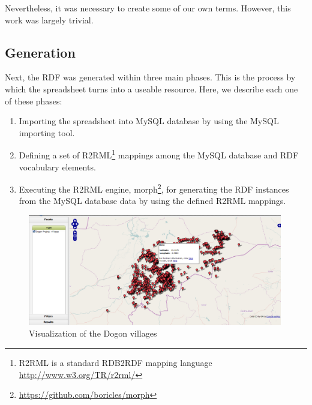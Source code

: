 Nevertheless, it was necessary to create some of our own terms. However, this work was largely trivial. %

\subsection{Generation}
Next, the RDF was generated within three main phases. This is the process by which the spreadsheet turns into a useable resource. Here, we describe each one of these phases:

\begin{enumerate}
	\item Importing the spreadsheet into MySQL database by using the MySQL importing tool.
	\item Defining a set of R2RML\footnote{R2RML is a standard RDB2RDF mapping language \url{http://www.w3.org/TR/r2rml/}} mappings among the MySQL database and RDF vocabulary elements.
	\item Executing the R2RML engine, morph\footnote{\url{https://github.com/boricles/morph}}, for generating the RDF instances from the MySQL database data by using the defined R2RML mappings.  
\end{enumerate}

\begin{figure}[htb!p]
\centering
\includegraphics[width=0.99\textwidth]{img/map4rdf.png}
\caption{Visualization of the Dogon villages}
\label{fig:map4rdf}
\end{figure}

